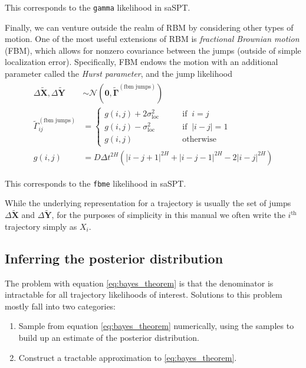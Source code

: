 \documentclass{article}
\renewcommand{\vec}{\mathbf}
\begin{document}
This corresponds to the \verb|gamma| likelihood in saSPT. \newline

Finally, we can venture outside the realm of RBM by considering other types of motion.
One of the most useful extensions of RBM is \emph{fractional Brownian motion} (FBM), which 
allows for nonzero covariance between the jumps (outside of simple localization error). 
Specifically, FBM endows the motion with an additional parameter called the 
\emph{Hurst parameter}, and the jump likelihood
\begin{align}\begin{split}\label{eq:fbme_likelihood}
	\Delta \tilde{\vec{X}}, \Delta \tilde{\vec{Y}} &\sim \mathcal{N} \left( 
		\vec{0}, \tilde{\boldsymbol{\Gamma}}^{(\text{fbm jumps})}
	\right) \\
	\tilde{\Gamma}^{(\text{fbm jumps})}_{ij} &= \begin{cases}
		g(i,j) + 2 \sigma_{\text{loc}}^{2} \qquad &\text{if } \: i = j \\
		g(i,j) - \sigma_{\text{loc}}^{2} \qquad &\text{if } \: \left| i - j \right| = 1 \\
		g(i,j) \qquad &\text{otherwise}
	\end{cases} \\
	g(i, j) &= D \Delta t^{2 H} \left( \left| i - j + 1 \right|^{2H} + \left| i - j - 1 \right|^{2H} - 2 \left| i - j \right|^{2H} \right)
\end{split}\end{align}

This corresponds to the \verb|fbme| likelihood in saSPT. \newline

While the underlying representation for a trajectory is usually the set of 
jumps $\Delta \tilde{\vec{X}}$ and $\Delta \tilde{\vec{Y}}$, for the purposes
of simplicity in this manual we often write the $i^{\text{th}}$ trajectory simply 
as $X_{i}$. 

\subsection{Inferring the posterior distribution}

The problem with equation \ref{eq:bayes_theorem} is that the denominator is 
intractable for all trajectory likelihoods of interest. Solutions to this problem
mostly fall into two categories:
\begin{enumerate}
	\item Sample from equation \ref{eq:bayes_theorem} numerically, using the samples to build up an estimate of the posterior distribution.
	\item Construct a tractable approximation to \ref{eq:bayes_theorem}. 
\end{enumerate}
\end{document}
